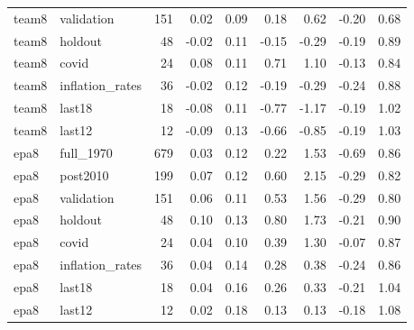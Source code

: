 \begin{table}
\begin{tabular}{llrrrrrrr}
team8 & validation & 151 & 0.02 & 0.09 & 0.18 & 0.62 & -0.20 & 0.68 \\
team8 & holdout & 48 & -0.02 & 0.11 & -0.15 & -0.29 & -0.19 & 0.89 \\
team8 & covid & 24 & 0.08 & 0.11 & 0.71 & 1.10 & -0.13 & 0.84 \\
team8 & inflation\_rates & 36 & -0.02 & 0.12 & -0.19 & -0.29 & -0.24 & 0.88 \\
team8 & last18 & 18 & -0.08 & 0.11 & -0.77 & -1.17 & -0.19 & 1.02 \\
team8 & last12 & 12 & -0.09 & 0.13 & -0.66 & -0.85 & -0.19 & 1.03 \\
epa8 & full\_1970 & 679 & 0.03 & 0.12 & 0.22 & 1.53 & -0.69 & 0.86 \\
epa8 & post2010 & 199 & 0.07 & 0.12 & 0.60 & 2.15 & -0.29 & 0.82 \\
epa8 & validation & 151 & 0.06 & 0.11 & 0.53 & 1.56 & -0.29 & 0.80 \\
epa8 & holdout & 48 & 0.10 & 0.13 & 0.80 & 1.73 & -0.21 & 0.90 \\
epa8 & covid & 24 & 0.04 & 0.10 & 0.39 & 1.30 & -0.07 & 0.87 \\
epa8 & inflation\_rates & 36 & 0.04 & 0.14 & 0.28 & 0.38 & -0.24 & 0.86 \\
epa8 & last18 & 18 & 0.04 & 0.16 & 0.26 & 0.33 & -0.21 & 1.04 \\
epa8 & last12 & 12 & 0.02 & 0.18 & 0.13 & 0.13 & -0.18 & 1.08 \\
\bottomrule
\end{tabular}
\end{table}
